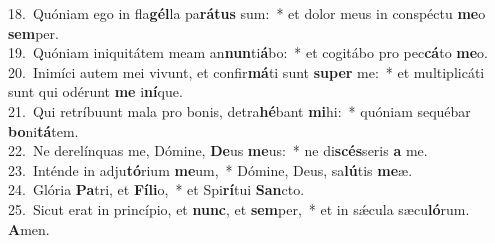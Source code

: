 {18.~}Quóniam ego in fla\textbf{gél}la pa\textbf{rá}\textbf{tus} sum:~* et dolor meus in conspéctu \textbf{me}o \textbf{sem}per.\\
{19.~}Quóniam iniquitátem meam an\textbf{nun}ti\textbf{á}bo:~* et cogitábo pro pec\textbf{cá}to \textbf{me}o.\\
{20.~}Inimíci autem mei vivunt, et confir\textbf{má}ti sunt \textbf{su}\textbf{per} me:~* et multiplicáti sunt qui odérunt \textbf{me} i\textbf{ní}que.\\
{21.~}Qui retríbuunt mala pro bonis, detra\textbf{hé}bant \textbf{mi}hi:~* quóniam sequébar \textbf{bo}ni\textbf{tá}tem.\\
{22.~}Ne derelínquas me, Dómine, \textbf{De}us \textbf{me}us:~* ne di\textbf{scés}seris \textbf{a} me.\\
{23.~}Inténde in adju\textbf{tó}rium \textbf{me}um,~* Dómine, Deus, sa\textbf{lú}tis \textbf{me}æ.\\
{24.~}Glória \textbf{Pa}tri, et \textbf{Fí}\textbf{li}o,~* et Spi\textbf{rí}tui \textbf{San}cto.\\
{25.~}Sicut erat in princípio, et \textbf{nunc}, et \textbf{sem}per,~* et in sǽcula sæcu\textbf{ló}rum. \textbf{A}men.\\
